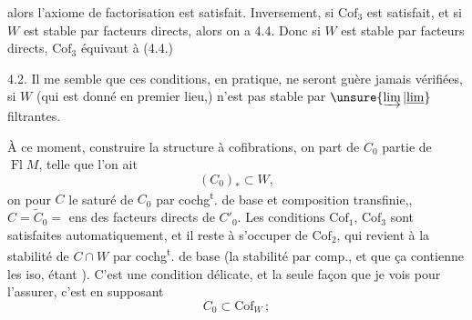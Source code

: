 
alors l'axiome de factorisation  est satisfait. Inversement, si $\mathrm{Cof}_3$ est satisfait, et si $W$ est stable par facteurs directs, alors on a 4.4. Donc si $W$ est stable par facteurs directs, $\mathrm{Cof}_3$ équivaut à (4.4.)

4.2. Il me semble que ces conditions, en pratique, ne seront guère jamais vérifiées,  si $W$ (qui est donné en  premier lieu,) 
n'est  pas stable par $\unsure{\varinjlim|\underline{\lim}}$ filtrantes.

À ce moment,  construire la structure à cofibrations, on part de $C_0$  partie de $\operatorname{Fl}M$,  telle que l'on ait
\[
(C_0)_{*}\subset W,\tag*{(4.5.)}
\]
on  pour  $C$ le saturé  de $C_0$ par cochg\textsuperscript{t}. de base et composition transfinie,,  $C=\widetilde C_0={}$ ens des facteurs directs de $C'_0$. Les conditions $\mathrm{Cof}_1$, $\mathrm{Cof}_3$ sont satisfaites automatiquement, et il reste à s'occuper de $\mathrm{Cof}_2$, qui revient à la stabilité de $C\cap W$ par cochg\textsuperscript{t}. de base (la stabilité par comp., et que ça contienne les iso, étant ). C'est une condition délicate, et la seule façon  que je vois pour l'assurer, c'est en supposant
\[
C_0\subset\mathrm{Cof}_W\,;\tag*{(4.6.)}
\]
